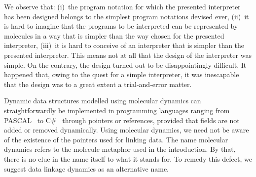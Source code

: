 \documentclass[fleqn]{llncs}
\begin{document}
We observe that:
(i)~the program notation for which the presented interpreter has been
designed belongs to the simplest program notations devised ever,
(ii)~it is hard to imagine that the programs to be interpreted can be
represented by molecules in a way that is simpler than the way chosen
for the presented interpreter,
(iii)~it is hard to conceive of an interpreter that is simpler than the
presented interpreter.
This means not at all that the design of the interpreter was simple.
On the contrary, the design turned out to be disappointingly difficult.
It happened that, owing to the quest for a simple interpreter, it was
inescapable that the design was to a great extent a trial-and-error
matter.

Dynamic data structures modelled using molecular dynamics can
straightforwardly be implemented in programming languages ranging from
PASCAL~\cite{Wir71a} to C\#~\cite{HWG03a} through pointers or
references, provided that fields are not added or removed dynamically.
Using molecular dynamics, we need not be aware of the existence of the
pointers used for linking data.
The name molecular dynamics refers to the molecule metaphor used in the
introduction.
By that, there is no clue in the name itself to what it stands for.
To remedy this defect, we suggest data linkage dynamics as an
alternative name.



\end{document}
